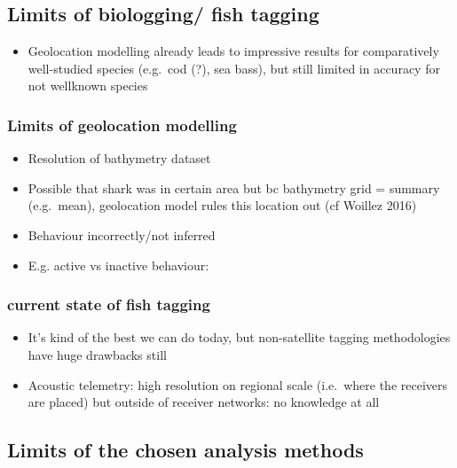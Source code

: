 \documentclass[
  authoryear,
  review,
  3p]{elsarticle}
\providecommand{\tightlist}{%
  \setlength{\itemsep}{0pt}\setlength{\parskip}{0pt}}\usepackage{longtable,booktabs,array}
\begin{document}
\hypertarget{limits-of-biologging-fish-tagging}{%
\subsection{Limits of biologging/ fish
tagging}\label{limits-of-biologging-fish-tagging}}

\begin{itemize}
\tightlist
\item
  Geolocation modelling already leads to impressive results for
  comparatively well-studied species (e.g.~cod (?), sea bass), but still
  limited in accuracy for not wellknown species
\end{itemize}

\hypertarget{limits-of-geolocation-modelling}{%
\subsubsection{Limits of geolocation
modelling}\label{limits-of-geolocation-modelling}}

\begin{itemize}
\tightlist
\item
  Resolution of bathymetry dataset
\item
  Possible that shark was in certain area but bc bathymetry grid =
  summary (e.g.~mean), geolocation model rules this location out (cf
  Woillez 2016)
\item
  Behaviour incorrectly/not inferred
\item
  E.g. active vs inactive behaviour:
\end{itemize}

\hypertarget{current-state-of-fish-tagging}{%
\subsubsection{current state of fish
tagging}\label{current-state-of-fish-tagging}}

\begin{itemize}
\tightlist
\item
  It's kind of the best we can do today, but non-satellite tagging
  methodologies have huge drawbacks still
\item
  Acoustic telemetry: high resolution on regional scale (i.e.~where the
  receivers are placed) but outside of receiver networks: no knowledge
  at all
\end{itemize}

\hypertarget{limits-of-the-chosen-analysis-methods}{%
\subsection{Limits of the chosen analysis
methods}\label{limits-of-the-chosen-analysis-methods}}
\end{document}
